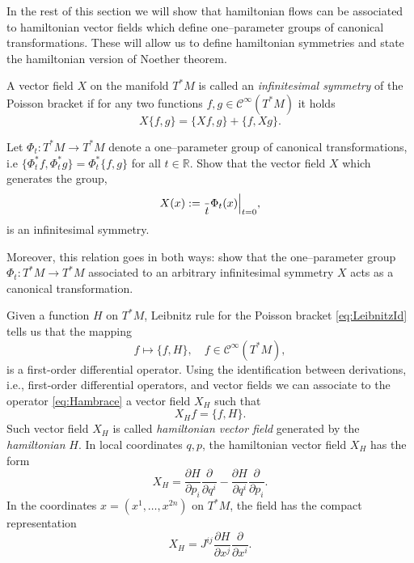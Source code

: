 \documentclass[english,fontsize=11pt,paper=a5,oneside]{scrbook}
\newcommand{\cC}{\mathcal{C}}
\newcommand{\R}{\mathbb{R}}
\let\d\relax
\newcommand{\d}{\mathrm{d}}
\theoremstyle{definition}
\newenvironment{exercise}
  {\pushQED{\qed}\renewcommand{\qedsymbol}{$\maltese$}\exercisex}
  {\popQED\endexercisex}
\begin{document}
In the rest of this section we will show that hamiltonian flows can be associated to hamiltonian vector fields which define one--parameter groups of canonical transformations. These will allow us to define hamiltonian symmetries and state the hamiltonian version of Noether theorem.

\begin{tcolorbox}
  A vector field $X$ on the manifold $T^* M$ is called an \emph{infinitesimal symmetry} of the Poisson bracket if for any two functions $f,g \in \cC^\infty(T^*M)$ it holds
  \begin{equation}\label{eq:infsymm}
    X\big\{f,g\big\} = \big\{X f, g\big\} + \big\{f, X g\big\}.
  \end{equation}
\end{tcolorbox}

\begin{exercise}\label{exe:haminfsym}
  Let $\Phi_t:T^*M \to T^*M$ denote a one--parameter group of canonical transformations, i.e $\big\{\Phi_t^* f, \Phi_t^* g\big\} = \Phi_t^*\big\{f,g\big\}$ for all $t\in\R$.
  Show that the vector field $X$ which generates the group,
  \begin{equation}
    X(x) := \frac{\d }{\d t}\Phi_t(x)\Big|_{t=0},
  \end{equation}
  is an infinitesimal symmetry.

  Moreover, this relation goes in both ways: show that the one--parameter group $\Phi_t:T^*M \to T^*M$ associated to an  arbitrary infinitesimal symmetry $X$ acts as a canonical transformation.
\end{exercise}

Given a function $H$ on $T^* M$, Leibnitz rule for the Poisson bracket \eqref{eq:LeibnitzId} tells us that the mapping
\begin{equation}\label{eq:Hambrace}
  f \mapsto \big\{f,H\big\}, \quad f\in\cC^\infty(T^*M),
\end{equation}
is a first-order differential operator.
Using the identification between derivations, i.e., first-order differential operators, and vector fields we can associate to the operator \eqref{eq:Hambrace} a vector field $X_H$ such that
\begin{equation}
  X_H f = \big\{f, H\big\}.
\end{equation}
Such vector field $X_H$ is called \emph{hamiltonian vector field} generated by the \emph{hamiltonian} $H$.
In local coordinates $q,p$, the hamiltonian vector field $X_H$ has the form
\begin{equation}
  X_H = \frac{\partial H}{\partial p_i} \frac{\partial}{\partial q^i} - \frac{\partial H}{\partial q^i}\frac{\partial}{\partial p_i}.
\end{equation}
In the coordinates $x = (x^1, \ldots, x^{2n})$ on $T^*M$, the field has the compact representation
\begin{equation}
  X_H = J^{ij}\frac{\partial H}{\partial x^j}\frac{\partial}{\partial x^i}.
\end{equation}
\end{document}
